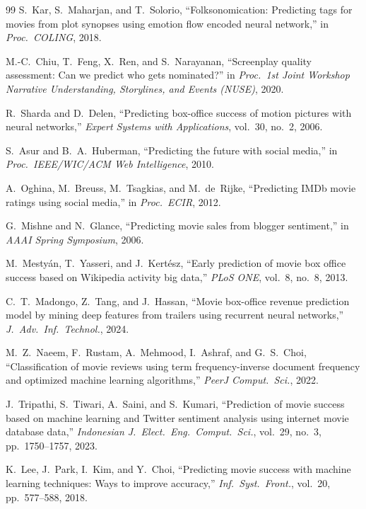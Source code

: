 \documentclass[conference,a4paper]{IEEEtran}
\begin{document}
\begin{thebibliography}{99}
S.~Kar, S.~Maharjan, and T.~Solorio, ``Folksonomication: Predicting tags
for movies from plot synopses using emotion flow encoded neural
network,'' in \emph{Proc.\ COLING}, 2018.

M.-C.~Chiu, T.~Feng, X.~Ren, and S.~Narayanan, ``Screenplay quality
assessment: Can we predict who gets nominated?'' in \emph{Proc.\ 1st
Joint Workshop Narrative Understanding, Storylines, and Events (NUSE)},
2020.

R.~Sharda and D.~Delen, ``Predicting box-office success of motion
pictures with neural networks,'' \emph{Expert Systems with
Applications}, vol.~30, no.~2, 2006.

S.~Asur and B.~A.~Huberman, ``Predicting the future with social media,''
in \emph{Proc.\ IEEE/WIC/ACM Web Intelligence}, 2010.

A.~Oghina, M.~Breuss, M.~Tsagkias, and M.~de~Rijke, ``Predicting IMDb
movie ratings using social media,'' in \emph{Proc.\ ECIR}, 2012.

G.~Mishne and N.~Glance, ``Predicting movie sales from blogger
sentiment,'' in \emph{AAAI Spring Symposium}, 2006.

M.~Mesty{\'a}n, T.~Yasseri, and J.~Kert{\'e}sz, ``Early prediction of
movie box office success based on Wikipedia activity big data,''
\emph{PLoS ONE}, vol.~8, no.~8, 2013.

C.~T.~Madongo, Z.~Tang, and J.~Hassan, ``Movie box-office revenue
prediction model by mining deep features from trailers using recurrent
neural networks,'' \emph{J.\ Adv.\ Inf.\ Technol.}, 2024.

M.~Z.~Naeem, F.~Rustam, A.~Mehmood, I.~Ashraf, and G.~S.~Choi,
``Classification of movie reviews using term frequency-inverse document
frequency and optimized machine learning algorithms,'' \emph{PeerJ
Comput.\ Sci.}, 2022.

J.~Tripathi, S.~Tiwari, A.~Saini, and S.~Kumari, ``Prediction of movie
success based on machine learning and Twitter sentiment analysis using
internet movie database data,'' \emph{Indonesian J.\ Elect.\ Eng.\
Comput.\ Sci.}, vol.~29, no.~3, pp.~1750--1757, 2023.

K.~Lee, J.~Park, I.~Kim, and Y.~Choi, ``Predicting movie success with
machine learning techniques: Ways to improve accuracy,'' \emph{Inf.\
Syst.\ Front.}, vol.~20, pp.~577--588, 2018.


\end{thebibliography}
\end{document}
